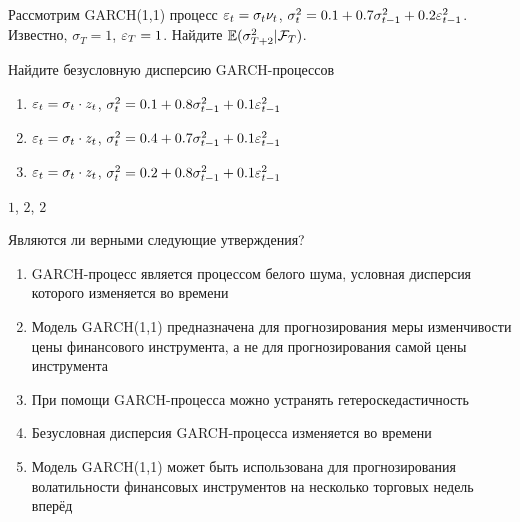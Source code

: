 \begin{problem}
Рассмотрим GARCH(1,1) процесс  $\varepsilon_t=\sigma_t \nu_t$, $\sigma^2_{t}=0.1 + 0.7 \sigma^2_{t-1} + 0.2 \varepsilon_{t-1}^2$. Известно, $\sigma_T=1$, $\varepsilon_T=1$. Найдите $\operatorname{\mathbb{E}}(\sigma_{T+2}^2 | \mathcal{F}_T )$.
\begin{sol}

\end{sol}
\end{problem}


\begin{problem}
Найдите безусловную дисперсию GARCH-процессов
\begin{enumerate}
\item $\varepsilon_t=\sigma_t \cdot z_t$, $\sigma^2_t=0.1+0.8\sigma^2_{t-1}+0.1\varepsilon^2_{t-1}$
\item $\varepsilon_t=\sigma_t \cdot z_t$, $\sigma^2_t=0.4+0.7\sigma^2_{t-1}+0.1\varepsilon^2_{t-1}$
\item $\varepsilon_t=\sigma_t \cdot z_t$, $\sigma^2_t=0.2+0.8\sigma^2_{t-1}+0.1\varepsilon^2_{t-1}$
\end{enumerate}


\begin{sol}
$1$, $2$, $2$
\end{sol}
\end{problem}


\begin{problem}
Являются ли верными следующие утверждения?
\begin{enumerate}
\item GARCH-процесс является процессом белого шума, условная дисперсия которого
изменяется во времени
\item Модель GARCH(1,1) предназначена для прогнозирования меры изменчивости цены
финансового инструмента, а не для прогнозирования самой цены инструмента
\item При помощи GARCH-процесса можно устранять гетероскедастичность
\item Безусловная дисперсия GARCH-процесса изменяется во времени
\item Модель GARCH(1,1) может быть использована для прогнозирования
волатильности финансовых инструментов на несколько торговых недель вперёд
\end{enumerate}


\begin{sol}
\end{sol}
\end{problem}



